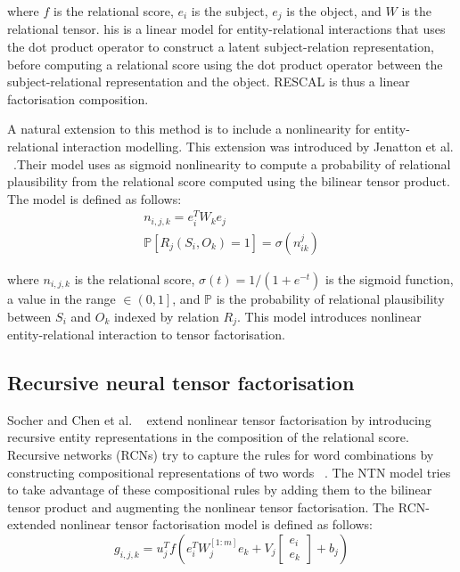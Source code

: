 \noindent where $f$ is the relational score, $e_i$ is the subject, $e_j$ is the object, and $W$ is the relational tensor. his is a linear model for entity-relational interactions that uses the dot product operator to construct a latent subject-relation representation, before computing a relational score using the dot product operator between the subject-relational representation and the object. RESCAL is thus a linear factorisation composition. \par

\noindent A natural extension to this method is to include a nonlinearity for entity-relational interaction modelling. This extension was introduced by Jenatton et al. \unskip ~\citep{jenatton2012latent}.Their model uses as sigmoid nonlinearity to compute a probability of relational plausibility from the relational score computed using the bilinear tensor product. The model is defined as follows:
\begin{subequations}
	\begin{gather}
		n_{i,j,k} = e_i^TW_ke_j \\
		\mathbb{P}\left [ R_j(S_i, O_k) = 1 \right ] = \sigma(n_{ik}^{j})
	\end{gather}
\end{subequations}

\noindent where $ n_{i,j,k} $ is the relational score, $ \sigma(t) = 1/(1 + e^{-t}) $ is the sigmoid function, a value in the range $\in \left ( 0, 1 \right ]$, and $\mathbb{P}$ is the probability of relational plausibility between $ S_i $ and $ O_k $ indexed by relation $ R_j $. This model introduces nonlinear entity-relational interaction to tensor factorisation. 

\subsection{Recursive neural tensor factorisation}

Socher and Chen et al.  \unskip ~\citep{socher2013reasoning} extend nonlinear tensor factorisation by introducing recursive entity representations in the composition of the relational score. Recursive networks (RCNs) try to capture the rules for word combinations by constructing compositional representations of two words \unskip ~\citep{socher2012semantic}. The NTN model tries to take advantage of these compositional rules by adding them to the bilinear tensor product and augmenting the nonlinear tensor factorisation. The RCN-extended nonlinear tensor factorisation model is defined as follows:
\begin{equation}
	g_{i,j,k} =  u_j^Tf(e_i^TW_j^{\left [1:m \right ]} e_k + V_j \left [ \begin{matrix} e_i \\ e_k \end{matrix} \right ] + b_j)
\end{equation}


